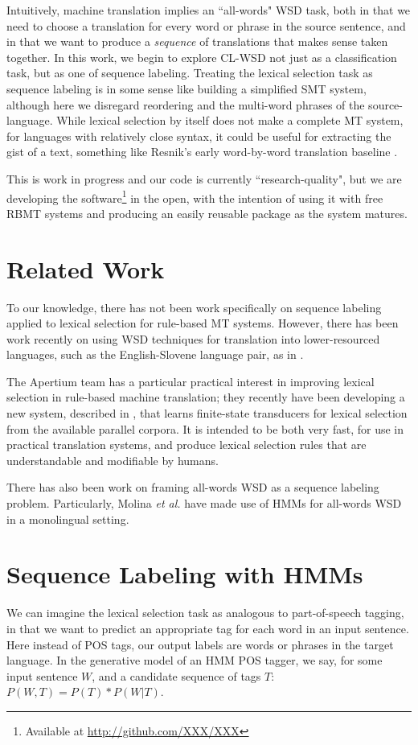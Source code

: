 \documentclass[11pt]{article}
\begin{document}
Intuitively, machine translation implies an ``all-words" WSD task, both in that
we need to choose a translation for every word or phrase in the source
sentence, and in that we want to produce a \emph{sequence} of translations that
makes sense taken together. In this work, we begin to explore CL-WSD not just
as a classification task, but as one of sequence labeling. Treating the lexical
selection task as sequence labeling is in some sense like building a simplified
SMT system, although here we disregard reordering and the multi-word phrases of
the source-language.  While lexical selection by itself does not make a
complete MT system, for languages with relatively close syntax, it could be
useful for extracting the gist of a text, something like Resnik's early
word-by-word translation baseline \cite{resnik:aaai}.

This is work in progress and our code is currently ``research-quality", but we
are developing the software\footnote{Available at
\url{http://github.com/XXX/XXX}} in the open, with the intention of using it
with free RBMT systems and producing an easily reusable package as the system
matures.

\section{Related Work}
To our knowledge, there has not been work specifically on sequence labeling
applied to lexical selection for rule-based MT systems. However, 
there has been work recently on using WSD techniques for translation into
lower-resourced languages, such as the English-Slovene language pair, as in 
\cite{vintar-fivser-vrvsvcaj:2012:ESIRMT-HyTra2012}. 

The Apertium team has a particular practical interest in improving lexical
selection in rule-based machine translation; they recently have been developing
a new system, described in \cite{tyers-fst}, that learns finite-state
transducers for lexical selection from the available parallel corpora. It is
intended to be both very fast, for use in practical translation systems, and
produce lexical selection rules that are understandable and modifiable by
humans.

There has also been work on framing all-words WSD as a sequence labeling
problem. Particularly, Molina \textit{et al.}
 have made use of HMMs for all-words
WSD in a monolingual setting.

\section{Sequence Labeling with HMMs}
We can imagine the lexical selection task as analogous to part-of-speech
tagging, in that we want to predict an appropriate tag for each word in an
input sentence. Here instead of POS tags, our output labels are words or
phrases in the target language. In the generative model of an HMM POS tagger,
we say, for some input sentence $W$, and a candidate sequence of tags $T$:
$ P(W, T) = P(T) * P(W|T) $.
\end{document}
